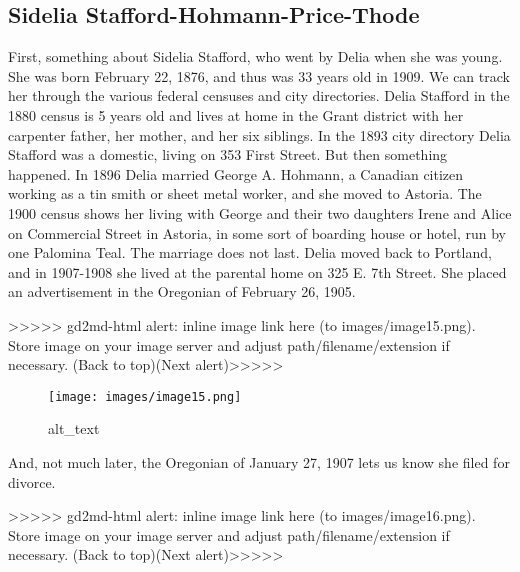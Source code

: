 \documentclass[
]{article}
\begin{document}
\hypertarget{section-3}{%
\subsection{}\label{section-3}}

\hypertarget{sidelia-stafford-hohmann-price-thode}{%
\subsection{Sidelia
Stafford-Hohmann-Price-Thode}\label{sidelia-stafford-hohmann-price-thode}}

First, something about Sidelia Stafford, who went by Delia when she was
young. She was born February 22, 1876, and thus was 33 years old in
1909. We can track her through the various federal censuses and city
directories. Delia Stafford in the 1880 census is 5 years old and lives
at home in the Grant district with her carpenter father, her mother, and
her six siblings. In the 1893 city directory Delia Stafford was a
domestic, living on 353 First Street. But then something happened. In
1896 Delia married George A. Hohmann, a Canadian citizen working as a
tin smith or sheet metal worker, and she moved to Astoria. The 1900
census shows her living with George and their two daughters Irene and
Alice on Commercial Street in Astoria, in some sort of boarding house or
hotel, run by one Palomina Teal. The marriage does not last. Delia moved
back to Portland, and in 1907-1908 she lived at the parental home on 325
E. 7th Street. She placed an advertisement in the Oregonian of February
26, 1905.

{\textgreater\textgreater\textgreater\textgreater\textgreater{}
gd2md-html alert: inline image link here (to images/image15.png). Store
image on your image server and adjust path/filename/extension if
necessary. }(Back to top)(Next
alert){\textgreater\textgreater\textgreater\textgreater\textgreater{} }

\begin{figure}
\centering
\texttt{[image: images/image15.png]}
\caption{alt\_text}
\end{figure}

And, not much later, the Oregonian of January 27, 1907 lets us know she
filed for divorce.

{\textgreater\textgreater\textgreater\textgreater\textgreater{}
gd2md-html alert: inline image link here (to images/image16.png). Store
image on your image server and adjust path/filename/extension if
necessary. }(Back to top)(Next
alert){\textgreater\textgreater\textgreater\textgreater\textgreater{} }
\end{document}
